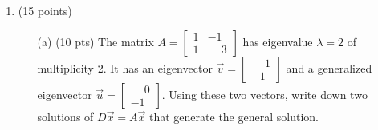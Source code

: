 \documentclass[12pt]{article}
\newcommand{\bu}{\vec{u}}
\newcommand{\bv}{\vec{v}}
\newcommand{\bx}{\vec{x}}
\begin{document}
\begin{enumerate}
      \item (15 points) 
      \begin{enumerate}
      \item[(a)] (10 pts) The matrix $A=\begin{bmatrix} 1 & -1 \\ 1 &\phantom{-}3
          \end{bmatrix}$ has eigenvalue $\lambda =2$ of multiplicity
          2.
          It has an eigenvector
          $\bv =\begin{bmatrix} \phantom{-}1 \\ -1\end{bmatrix}$
          and a generalized eigenvector
          $\bu=\begin{bmatrix} \phantom{-}0 \\ -1\end{bmatrix}$.
          Using these two vectors, write down two solutions of $D\bx = A\bx$ that generate the
          general solution.  
          
     \vspace{2in}
     

\end{enumerate}
\end{enumerate}
\end{document}
